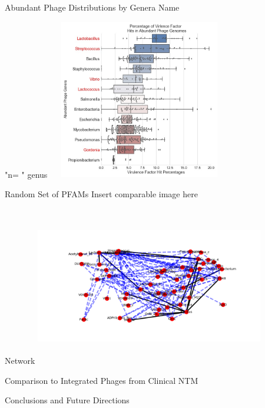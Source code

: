 \documentclass[11pt, xcolor=table]{beamer}
\begin{document}
	\begin{frame}{Abundant Phage Distributions by Genera Name}
	\centering
	
	"n=  "
	genus
	\includegraphics[height=7cm, width=8cm]{Top_Phages_Plots.jpg}
	
	\end{frame}
	\begin{frame}{Random Set of PFAMs}
	Insert comparable image here
	\end{frame}
	\begin{frame}{Network}
	\center
	\includegraphics[height=7cm, width=10cm]{CPBS_11_18/weighted_graph.png}
	\end{frame}
	\begin{frame}{Comparison to Integrated Phages from Clinical NTM}

	\end{frame}
	
	\begin{frame}{Conclusions and Future Directions}
	
	\end{frame}
	
\end{document}
